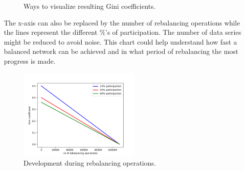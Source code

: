 \documentclass[final]{fhnwreport}       %
\begin{document}
\begin{figure}[h]
\centering
{}\qquad
{}
\caption{Ways to visualize resulting Gini coefficients.}
\label{fig:Subfigure}
\end{figure}

The x-axis can also be replaced by the number of rebalancing operations while the lines represent the different \%'s of participation. The number of data series might be reduced to avoid noise. This chart could help understand how fast a balanced network can be achieved and in what period of rebalancing the most progress is made.

\begin{figure}[h]
\centering
\includegraphics[width=6cm]{dummy_charts/rebal_op.png}
\caption{Development during rebalancing operations.}
\label{fig:Figure}
\end{figure}
\end{document}
